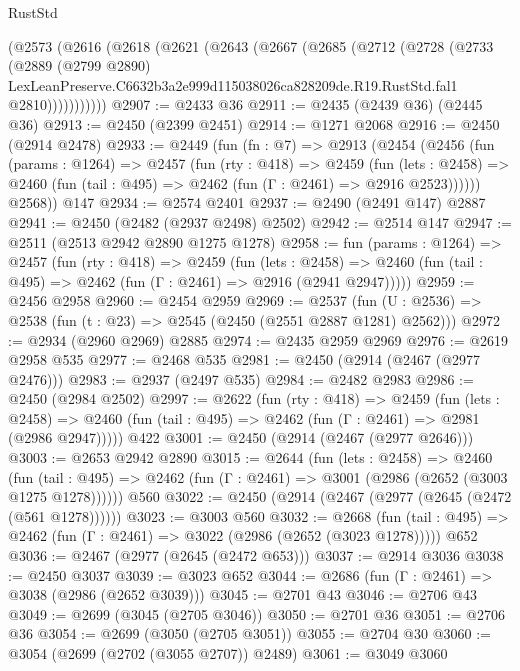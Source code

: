 \begin{lexlean}{RustStd}
\begin{coremodule}
    (@2573
      (@2616
        (@2618
          (@2621
            (@2643
              (@2667
                (@2685
                  (@2712
                    (@2728
                      (@2733
                        (@2889
                          (@2799 @2890)
                          LexLeanPreserve.C6632b3a2e999d115038026ca828209de.R19.RustStd.fal1
                          @2810)))))))))))
@2907 := @2433 @36
@2911 := @2435 (@2439 @36) (@2445 @36)
@2913 := @2450 (@2399 @2451)
@2914 := @1271 @2068
@2916 := @2450 (@2914 @2478)
@2933 := @2449
    (fun (fn : @7) =>
    @2913
      (@2454
        (@2456
          (fun (params : @1264) =>
          @2457
            (fun (rty : @418) =>
            @2459
              (fun (lets : @2458) =>
              @2460 (fun (tail : @495) => @2462 (fun (Γ : @2461) => @2916 @2523))))))
        @2568))
    @147
@2934 := @2574 @2401
@2937 := @2490 (@2491 @147) @2887
@2941 := @2450 (@2482 (@2937 @2498) @2502)
@2942 := @2514 @147
@2947 := @2511 (@2513 @2942 @2890 @1275 @1278)
@2958 := fun (params : @1264) =>
  @2457
    (fun (rty : @418) =>
    @2459
      (fun (lets : @2458) =>
      @2460 (fun (tail : @495) => @2462 (fun (Γ : @2461) => @2916 (@2941 @2947)))))
@2959 := @2456 @2958
@2960 := @2454 @2959
@2969 := @2537 (fun (U : @2536) => @2538 (fun (t : @23) => @2545 (@2450 (@2551 @2887 @1281) @2562)))
@2972 := @2934 (@2960 @2969) @2885
@2974 := @2435 @2959 @2969
@2976 := @2619 @2958 @535
@2977 := @2468 @535
@2981 := @2450 (@2914 (@2467 (@2977 @2476)))
@2983 := @2937 (@2497 @535)
@2984 := @2482 @2983
@2986 := @2450 (@2984 @2502)
@2997 := @2622
    (fun (rty : @418) =>
    @2459
      (fun (lets : @2458) =>
      @2460 (fun (tail : @495) => @2462 (fun (Γ : @2461) => @2981 (@2986 @2947)))))
    @422
@3001 := @2450 (@2914 (@2467 (@2977 @2646)))
@3003 := @2653 @2942 @2890
@3015 := @2644
    (fun (lets : @2458) =>
    @2460
      (fun (tail : @495) => @2462 (fun (Γ : @2461) => @3001 (@2986 (@2652 (@3003 @1275 @1278))))))
    @560
@3022 := @2450 (@2914 (@2467 (@2977 (@2645 (@2472 (@561 @1278))))))
@3023 := @3003 @560
@3032 := @2668
    (fun (tail : @495) => @2462 (fun (Γ : @2461) => @3022 (@2986 (@2652 (@3023 @1278)))))
    @652
@3036 := @2467 (@2977 (@2645 (@2472 @653)))
@3037 := @2914 @3036
@3038 := @2450 @3037
@3039 := @3023 @652
@3044 := @2686 (fun (Γ : @2461) => @3038 (@2986 (@2652 @3039)))
@3045 := @2701 @43
@3046 := @2706 @43
@3049 := @2699 (@3045 (@2705 @3046))
@3050 := @2701 @36
@3051 := @2706 @36
@3054 := @2699 (@3050 (@2705 @3051))
@3055 := @2704 @30
@3060 := @3054 (@2699 (@2702 (@3055 @2707)) @2489)
@3061 := @3049 @3060

\end{coremodule}
\end{lexlean}
